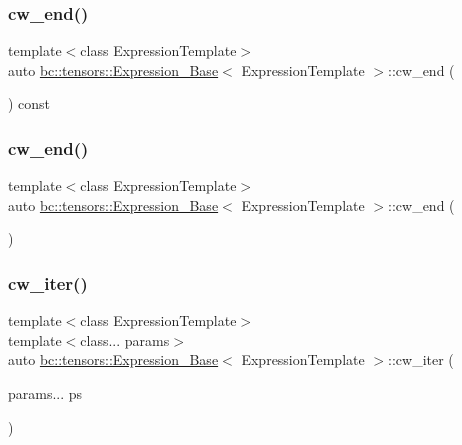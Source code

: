\subsubsection{\texorpdfstring{cw\+\_\+end()}{cw\_end()}\hspace{0.1cm}{\footnotesize\ttfamily [1/2]}}
{\footnotesize\ttfamily template$<$class Expression\+Template$>$ \\
auto \hyperlink{classbc_1_1tensors_1_1Expression__Base}{bc\+::tensors\+::\+Expression\+\_\+\+Base}$<$ Expression\+Template $>$\+::cw\+\_\+end (\begin{DoxyParamCaption}{ }\end{DoxyParamCaption}) const\hspace{0.3cm}{\ttfamily [inline]}}

\mbox{\label{classbc_1_1tensors_1_1Expression__Base_a744749a4bfd3082ad2f99c8a296b4397}} 
\subsubsection{\texorpdfstring{cw\+\_\+end()}{cw\_end()}\hspace{0.1cm}{\footnotesize\ttfamily [2/2]}}
{\footnotesize\ttfamily template$<$class Expression\+Template$>$ \\
auto \hyperlink{classbc_1_1tensors_1_1Expression__Base}{bc\+::tensors\+::\+Expression\+\_\+\+Base}$<$ Expression\+Template $>$\+::cw\+\_\+end (\begin{DoxyParamCaption}{ }\end{DoxyParamCaption})\hspace{0.3cm}{\ttfamily [inline]}}

\mbox{\label{classbc_1_1tensors_1_1Expression__Base_ae5037e9e9f9aa3805f33300656aca202}} 
\subsubsection{\texorpdfstring{cw\+\_\+iter()}{cw\_iter()}\hspace{0.1cm}{\footnotesize\ttfamily [1/2]}}
{\footnotesize\ttfamily template$<$class Expression\+Template$>$ \\
template$<$class... params$>$ \\
auto \hyperlink{classbc_1_1tensors_1_1Expression__Base}{bc\+::tensors\+::\+Expression\+\_\+\+Base}$<$ Expression\+Template $>$\+::cw\+\_\+iter (\begin{DoxyParamCaption}\item[{params...}]{ps }\end{DoxyParamCaption})\hspace{0.3cm}{\ttfamily [inline]}}

